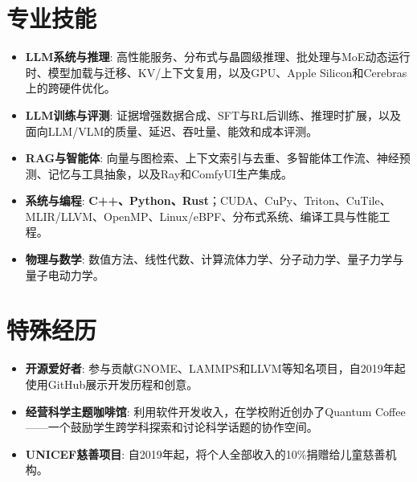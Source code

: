 \documentclass[a4paper,20pt]{article}
\newcommand{\resumeItem}[2]{
  \item\small{
    \textbf{#1}{: #2 \vspace{-2pt}}
  }
}
\newcommand{\resumeSubItem}[2]{\resumeItem{#1}{#2}\vspace{-3pt}}
\newcommand{\resumeSubHeadingListStart}{\begin{itemize}[leftmargin=*]}
\newcommand{\resumeSubHeadingListEnd}{\end{itemize}}
\newcommand{\resumeItemListEnd}{\end{itemize}\vspace{-3pt}}
\begin{document}

\section{专业技能}

\resumeSubHeadingListStart
\resumeSubItem{LLM系统与推理}{高性能服务、分布式与晶圆级推理、批处理与MoE动态运行时、模型加载与迁移、KV/上下文复用，以及GPU、Apple Silicon和Cerebras上的跨硬件优化。}
\resumeSubItem{LLM训练与评测}{证据增强数据合成、SFT与RL后训练、推理时扩展，以及面向LLM/VLM的质量、延迟、吞吐量、能效和成本评测。}
\resumeSubItem{RAG与智能体}{向量与图检索、上下文索引与去重、多智能体工作流、神经预测、记忆与工具抽象，以及Ray和ComfyUI生产集成。}
\resumeSubItem{系统与编程}{\textbf{C++、Python、Rust}；CUDA、CuPy、Triton、CuTile、MLIR/LLVM、OpenMP、Linux/eBPF、分布式系统、编译工具与性能工程。}
\resumeSubItem{物理与数学}{数值方法、线性代数、计算流体力学、分子动力学、量子力学与量子电动力学。}
\resumeSubHeadingListEnd



\section{特殊经历}

\resumeSubHeadingListStart
\resumeSubItem{开源爱好者}{参与贡献GNOME、LAMMPS和LLVM等知名项目，自2019年起使用GitHub展示开发历程和创意。}
\resumeSubItem{经营科学主题咖啡馆}{利用软件开发收入，在学校附近创办了Quantum Coffee——一个鼓励学生跨学科探索和讨论科学话题的协作空间。}
\resumeSubItem{UNICEF慈善项目}{自2019年起，将个人全部收入的10\%捐赠给儿童慈善机构。}
\resumeItemListEnd
\end{document}

